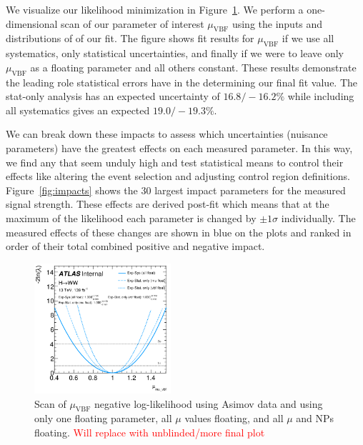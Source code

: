 We visualize our likelihood minimization in Figure~\ref{fig:scan}. We perform a one-dimensional scan of our parameter of interest $\mu_{\text{VBF}}$ using the inputs and distributions of of our fit. The figure shows fit results for $\mu_{\text{VBF}}$ if we use all systematics, only statistical uncertainties, and finally if we were to leave only $\mu_{\text{VBF}}$ as a floating parameter and all others constant. These results demonstrate the leading role statistical errors have in the determining our final fit value. The stat-only analysis has an expected uncertainty of $16.8/-16.2\%$ while including all systematics gives an expected $19.0/-19.3\%$. 

We can break down these impacts to assess which uncertainties (nuisance parameters) have the greatest effects on each measured parameter. In this way, we find any that seem unduly high and test statistical means to control their effects like altering the event selection and adjusting control region definitions. Figure~\ref{fig:impacts} shows the 30 largest impact parameters for the measured signal strength. These effects are derived post-fit which means that at the maximum of the likelihood each parameter is changed by $\pm 1\sigma$ individually. The measured effects of these changes are shown in blue on the plots and ranked in order of their total combined positive and negative impact. 

\begin{figure}[!h]
\centering
\includegraphics[width=0.45\textwidth]{Pictures/fitresults/afterfit.png}
\caption{Scan of $\mu_{\text{VBF}}$ negative log-likelihood using Asimov data and using only one floating parameter, all $\mu$ values floating, and all $\mu$ and NPs floating. \textcolor{red}{Will replace with unblinded/more final plot}}
\label{fig:scan}
\end{figure}

